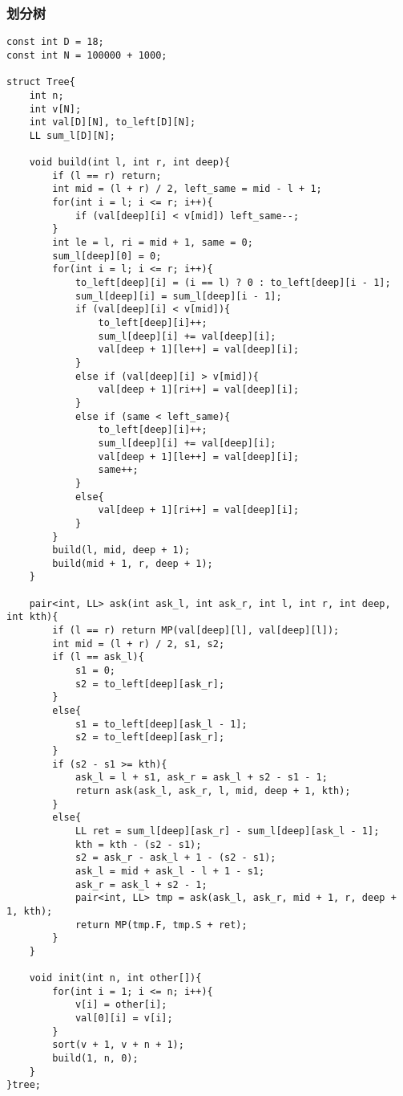 \subsubsection{划分树}
\begin{verbatim}
const int D = 18;
const int N = 100000 + 1000;

struct Tree{
	int n;
	int v[N];
	int val[D][N], to_left[D][N];
	LL sum_l[D][N];

	void build(int l, int r, int deep){
		if (l == r) return;
		int mid = (l + r) / 2, left_same = mid - l + 1;
		for(int i = l; i <= r; i++){
			if (val[deep][i] < v[mid]) left_same--;
		}
		int le = l, ri = mid + 1, same = 0;
		sum_l[deep][0] = 0;
		for(int i = l; i <= r; i++){
			to_left[deep][i] = (i == l) ? 0 : to_left[deep][i - 1];
			sum_l[deep][i] = sum_l[deep][i - 1];
			if (val[deep][i] < v[mid]){
				to_left[deep][i]++;
				sum_l[deep][i] += val[deep][i];
				val[deep + 1][le++] = val[deep][i];
			}
			else if (val[deep][i] > v[mid]){
				val[deep + 1][ri++] = val[deep][i];
			}
			else if (same < left_same){
				to_left[deep][i]++;
				sum_l[deep][i] += val[deep][i];
				val[deep + 1][le++] = val[deep][i];
				same++;
			}
			else{
				val[deep + 1][ri++] = val[deep][i];
			}
		}
		build(l, mid, deep + 1);
		build(mid + 1, r, deep + 1);
	}

	pair<int, LL> ask(int ask_l, int ask_r, int l, int r, int deep, int kth){ 
		if (l == r) return MP(val[deep][l], val[deep][l]);
		int mid = (l + r) / 2, s1, s2;
		if (l == ask_l){
			s1 = 0;
			s2 = to_left[deep][ask_r];
		}
		else{
			s1 = to_left[deep][ask_l - 1];
			s2 = to_left[deep][ask_r];
		}
		if (s2 - s1 >= kth){
			ask_l = l + s1, ask_r = ask_l + s2 - s1 - 1;
			return ask(ask_l, ask_r, l, mid, deep + 1, kth);
		}
		else{
			LL ret = sum_l[deep][ask_r] - sum_l[deep][ask_l - 1];
			kth = kth - (s2 - s1);
			s2 = ask_r - ask_l + 1 - (s2 - s1);
			ask_l = mid + ask_l - l + 1 - s1;
			ask_r = ask_l + s2 - 1;
			pair<int, LL> tmp = ask(ask_l, ask_r, mid + 1, r, deep + 1, kth);
			return MP(tmp.F, tmp.S + ret);
		}
	}

	void init(int n, int other[]){
		for(int i = 1; i <= n; i++){
			v[i] = other[i];
			val[0][i] = v[i];
		}
		sort(v + 1, v + n + 1);
		build(1, n, 0);
	}
}tree;
\end{verbatim}
